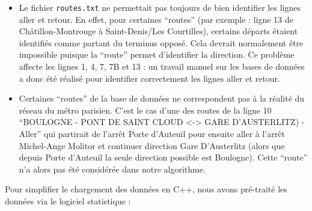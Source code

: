 \documentclass[,french]{article}
\begin{document}
\begin{itemize}
\item
  Le fichier \texttt{routes.txt} ne permettait pas toujours de bien
  identifier les lignes aller et retour. En effet, pour certaines
  ``routes'' (par exemple : ligne 13 de Châtillon-Montrouge à
  Saint-Denis/Les Courtilles), certains départs étaient identifiés comme
  partant du terminus opposé. Cela devrait normalement être impossible
  puisque la ``route'' permet d'identifier la direction. Ce problème
  affecte les lignes 1, 4, 7, 7B et 13 : un travail manuel sur les bases
  de données a donc été réalisé pour identifier correctement les lignes
  aller et retour.
\item
  Certaines ``routes'' de la base de données ne correspondent pas à la
  réalité du réseau du métro parisien. C'est le cas d'une des routes de
  la ligne 10 ``BOULOGNE - PONT DE SAINT CLOUD
  \textless{}-\textgreater{} GARE D'AUSTERLITZ) - Aller'' qui partirait
  de l'arrêt Porte d'Auteuil pour ensuite aller à l'arrêt Michel-Ange
  Molitor et continuer direction Gare D'Austerlitz (alors que depuis
  Porte d'Auteuil la seule direction possible est Boulogne). Cette
  ``route'' n'a alors pas été considérée dans notre algorithme.
\end{itemize}

Pour simplifier le chargement des données en C++, nous avons pré-traité
les données via le logiciel statistique \faRProject :
\end{document}
